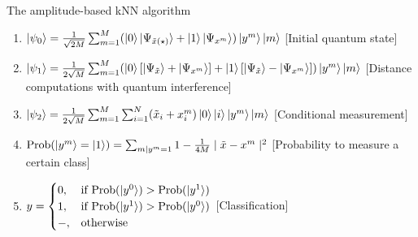 \documentclass[10pt]{beamer}
\begin{document}
{
\begin{frame}[fragile]{The amplitude-based kNN algorithm}

\begin{enumerate}
\item $\ket{\psi_0} = \frac{1}{\sqrt{2M}}\sum_{m=1}^{M} (\ket{0}\ket{\Psi_{\tilde{x} (\star)}}+\ket{1}\ket{\Psi_{x^{m}}})\ket{y^{m}}\ket{m}$\hspace{2cm} [Initial quantum state]
\vspace{0.3cm}
\item $\ket{\psi_1} =  \frac{1}{2\sqrt{M}}\sum_{m=1}^{M} (\ket{0}[\ket{\Psi_{\tilde{x}}}+\ket{\Psi_{x^{m}}}]+\ket{1}[\ket{\Psi_{\tilde{x}}}-\ket{\Psi_{x^{m}}}])\ket{y^{m}}\ket{m}$ \hfill
[Distance computations with quantum interference]
\vspace{0.3cm}
\item $\ket{\psi_2} = \frac{1}{2\sqrt{M}}\sum_{m=1}^{M} \sum_{i=1}^{N} (\tilde{x}_i+x_i^m)\ket{0}\ket{i}\ket{y^{m}}\ket{m}$\hfill
\hspace{2cm}[Conditional measurement]
\vspace{0.3cm}
\item $\mathrm{Prob}(\ket{y^m} = \ket{1})= \sum_{m \mid y^m=1} 1 - \frac{1}{4M} \mid \tilde{x} - x^m \mid ^2$\hfill
\hspace{2cm} [Probability to measure a certain class]
\item $ y = \begin{cases}
      0, & \text{if}\ \mathrm{Prob}(\ket{y^0}) > \mathrm{Prob}(\ket{y^1}) \\
      1, & \text{if}\ \mathrm{Prob}(\ket{y^1}) > \mathrm{Prob}(\ket{y^0}) \\
      -, & \text{otherwise}
    \end{cases}$\hspace{1cm} [Classification]
\end{enumerate}
\end{frame}
}
\end{document}
